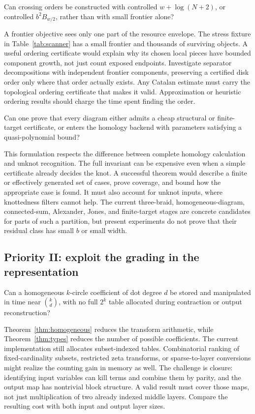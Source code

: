 \begin{question}
Can crossing orders be constructed with controlled
$w+\log(N+2)$, or controlled $b^2 B_{w/2}$, rather than with small
frontier alone?
\end{question}
A frontier objective sees only one part of the resource envelope.
The stress fixture in Table~\ref{tab:scanner} has a small frontier and
thousands of surviving objects. A useful ordering certificate would
explain why its chosen local pieces have bounded component growth, not
just count exposed endpoints. Investigate separator decompositions with
independent frontier components, preserving a certified disk order only
where that order actually exists. Any Catalan estimate must carry the
topological ordering certificate that makes it valid. Approximation or
heuristic ordering results should charge the time spent finding the order.

\begin{question}
Can one prove that every diagram either admits a cheap structural or
finite-target certificate, or enters the homology backend with parameters
satisfying a quasi-polynomial bound?
\end{question}
This formulation respects the difference between complete homology
calculation and unknot recognition. The full invariant can be expensive
even when a simple certificate already decides the knot. A successful
theorem would describe a finite or effectively generated set of cases,
prove coverage, and bound how the appropriate case is found. It must also
account for unknot inputs, where knottedness filters cannot help. The
current three-braid, homogeneous-diagram, connected-sum, Alexander,
Jones, and finite-target stages are concrete candidates for parts of
such a partition, but present experiments do not prove that their
residual class has small $b$ or small width.

\subsection{Priority II: exploit the grading in the representation}

\begin{question}
Can a homogeneous $k$-circle coefficient of dot degree $d$ be stored
and manipulated in time near $\binom{k}{d}$, with no full $2^k$ table
allocated during contraction or output reconstruction?
\end{question}
Theorem~\ref{thm:homogeneous} reduces the transform arithmetic, while
Theorem~\ref{thm:types} reduces the number of possible coefficients.
The current implementation still allocates subset-indexed tables.
Combinatorial ranking of fixed-cardinality subsets, restricted zeta
transforms, or sparse-to-layer conversions might realize the counting
gain in memory as well. The challenge is closure: identifying input
variables can kill terms and combine them by parity, and the output map
has nontrivial block structure. A valid result must cover those maps,
not just multiplication of two already indexed middle layers. Compare
the resulting cost with both input and output layer sizes.

